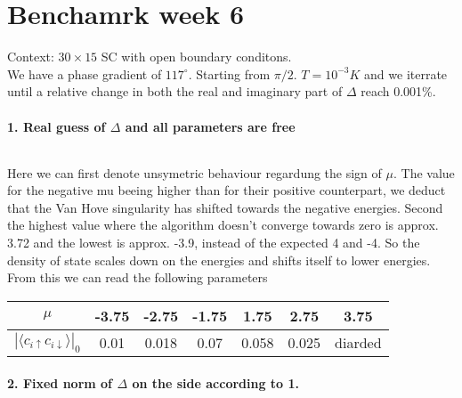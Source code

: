 \documentclass[../main.tex]{subfiles}
\begin{document}
\section{Benchamrk week 6}
Context: $30\times 15$ SC with open boundary conditons.\\

We have a phase gradient of $117^{\circ}$. Starting from $\pi/2$. $T=10^{-3}K$ and we iterrate until a relative
change in both the real and imaginary part of $\Delta$ reach 0.001\%. \\

\paragraph{1. Real guess of $\Delta$ and all parameters are free}$~$\\
\begin{figure}[H]
    \centering
    
    \caption{}
\end{figure}
Here we can first denote unsymetric behaviour regardung the sign of $\mu$. The value for the negative
mu beeing higher than for their positive counterpart, we deduct that the Van Hove singularity has shifted towards the negative energies.
Second the highest value where the algorithm doesn't converge towards zero is approx. 3.72 and the lowest is approx. -3.9, instead of the expected 4 and -4. 
So the density of state scales down on the energies and shifts itself to lower energies.
From this we can read the following parameters
\begin{table}[H]
    \centering
    \begin{tabular}{c|c|c|c|c|c|c}
        $\mu$          & -3.75 & -2.75 & -1.75 & 1.75 & 2.75  & 3.75\\\hline\hline
         $|\langle c_{i\uparrow}c_{i\downarrow}\rangle|_0$  & 0.01  & 0.018 &  0.07  & 0.058& 0.025 & diarded
    \end{tabular}
\end{table}

\paragraph{2. Fixed norm of $\Delta$ on the side according to 1.}$~$\\
\begin{figure}[H]
    \centering
    
    \caption{}
\end{figure}
\end{document}
